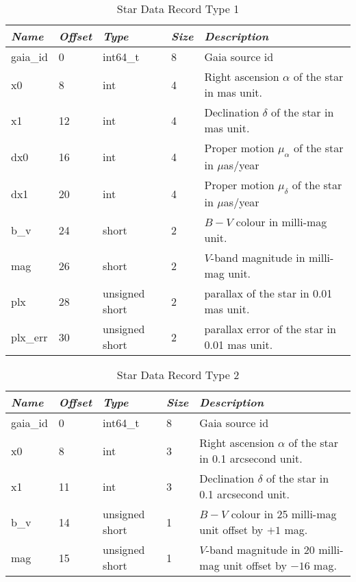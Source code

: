 \begin{table}[htbp]
\begin{tabularx}{\textwidth}{llllX}\toprule
\emph{Name} & \emph{Offset}& \emph{Type} & \emph{Size} &\emph{Description}\\\midrule
gaia\_id       &  0 & int64\_t           & 8 & Gaia source id\\%
x0             &  8 & int                & 4 & Right ascension $\alpha$ of the star in mas unit.\\
x1             & 12 & int                & 4 & Declination $\delta$ of the star in mas unit.\\%
dx0            & 16 & int                & 4 & Proper motion $\mu_{\alpha}$ of the star in $\mu$as/year\\
dx1            & 20 & int                & 4 & Proper motion $\mu_{\delta}$ of the star in $\mu$as/year\\%
b\_v           & 24 & short              & 2 & $B-V$ colour in milli-mag unit.\\
mag            & 26 & short              & 2 & $V$-band magnitude in milli-mag unit.\\
plx            & 28 & unsigned short     & 2 & parallax of the star in 0.01 mas unit.\\
plx\_err       & 30 & unsigned short     & 2 & parallax error of the star in 0.01 mas unit.\\\bottomrule
\end{tabularx}
\caption{Star Data Record Type 1}
\label{tab:StarDataRecord1}
\end{table}


\begin{table}[htbp]
\begin{tabularx}{\textwidth}{llllX}\toprule
\emph{Name} & \emph{Offset} & \emph{Type} & \emph{Size} & \emph{Description}\\\midrule
gaia\_id       &  0 & int64\_t           & 8 & Gaia source id\\
x0             &  8 & int                & 3 & Right ascension $\alpha$ of the star in 0.1 arcsecond unit.\\
x1             & 11 & int                & 3 & Declination $\delta$ of the star in 0.1 arcsecond unit.\\
b\_v           & 14 & unsigned short     & 1 & $B-V$ colour in 25 milli-mag unit offset by $+1$ mag.\\
mag            & 15 & unsigned short     & 1 & $V$-band magnitude in 20 milli-mag unit offset by $-16$ mag.\\\bottomrule
\end{tabularx}
\caption{Star Data Record Type 2}
\label{tab:StarDataRecord2}
\end{table}



